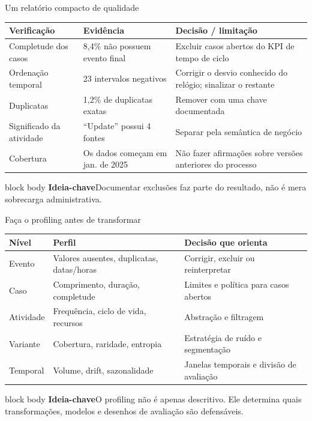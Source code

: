 \documentclass[aspectratio=169,11pt]{beamer}
\newcommand{\keyidea}[1]{%
  \begin{beamercolorbox}[rounded=true,sep=0.65em]{block body}
    \textbf{\color{Teal}Ideia-chave}\quad #1
  \end{beamercolorbox}
}
\begin{document}
\begin{frame}[shrink=3]{Um relatório compacto de qualidade}
  \small
  \begin{tabular}{@{}p{}p{}p{}@{}}
    \toprule
    Verificação & Evidência & Decisão / limitação\\
    \midrule
    Completude dos casos & 8,4\% não possuem evento final & Excluir casos abertos do KPI de tempo de ciclo\\
    Ordenação temporal & 23 intervalos negativos & Corrigir o desvio conhecido do relógio; sinalizar o restante\\
    Duplicatas & 1,2\% de duplicatas exatas & Remover com uma chave documentada\\
    Significado da atividade & ``Update'' possui 4 fontes & Separar pela semântica de negócio\\
    Cobertura & Os dados começam em jan. de 2025 & Não fazer afirmações sobre versões anteriores do processo\\
    \bottomrule
  \end{tabular}
  \vspace{0.45cm}
  \keyidea{Documentar exclusões faz parte do resultado, não é mera sobrecarga administrativa.}
\end{frame}

\begin{frame}[shrink=8]{Faça o profiling antes de transformar}
  \small
  \begin{tabular}{@{}p{}p{}p{}@{}}
    \toprule
    Nível & Perfil & Decisão que orienta\\
    \midrule
    Evento & Valores ausentes, duplicatas, datas/horas & Corrigir, excluir ou reinterpretar\\
    Caso & Comprimento, duração, completude & Limites e política para casos abertos\\
    Atividade & Frequência, ciclo de vida, recursos & Abstração e filtragem\\
    Variante & Cobertura, raridade, entropia & Estratégia de ruído e segmentação\\
    Temporal & Volume, drift, sazonalidade & Janelas temporais e divisão de avaliação\\
    \bottomrule
  \end{tabular}
  \vspace{0.45cm}
  \keyidea{O profiling não é apenas descritivo. Ele determina quais transformações, modelos e desenhos de avaliação são defensáveis.}
\end{frame}
\end{document}
